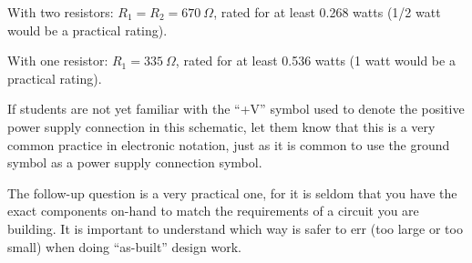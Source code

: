 
With two resistors: $R_1 = R_2 = 670 \> \Omega$, rated for at least 0.268 watts (1/2 watt would be a practical rating). 

\vskip 10pt

With one resistor: $R_1 = 335 \> \Omega$, rated for at least 0.536 watts (1 watt would be a practical rating). 







If students are not yet familiar with the ``+V'' symbol used to denote the positive power supply connection in this schematic, let them know that this is a very common practice in electronic notation, just as it is common to use the ground symbol as a power supply connection symbol.

The follow-up question is a very practical one, for it is seldom that you have the exact components on-hand to match the requirements of a circuit you are building.  It is important to understand which way is safer to err (too large or too small) when doing ``as-built'' design work.




